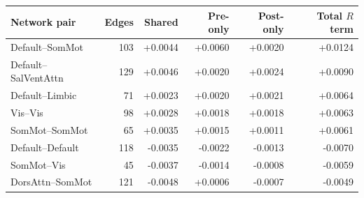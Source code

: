 \begin{tabular}{lrrrrr}
\toprule
Network pair & Edges & Shared & Pre-only & Post-only & Total $R$ term \\
\midrule
Default--SomMot & 103 & +0.0044 & +0.0060 & +0.0020 & +0.0124 \\
Default--SalVentAttn & 129 & +0.0046 & +0.0020 & +0.0024 & +0.0090 \\
Default--Limbic & 71 & +0.0023 & +0.0020 & +0.0021 & +0.0064 \\
Vis--Vis & 98 & +0.0028 & +0.0018 & +0.0018 & +0.0063 \\
SomMot--SomMot & 65 & +0.0035 & +0.0015 & +0.0011 & +0.0061 \\
Default--Default & 118 & -0.0035 & -0.0022 & -0.0013 & -0.0070 \\
SomMot--Vis & 45 & -0.0037 & -0.0014 & -0.0008 & -0.0059 \\
DorsAttn--SomMot & 121 & -0.0048 & +0.0006 & -0.0007 & -0.0049 \\
\bottomrule
\end{tabular}
